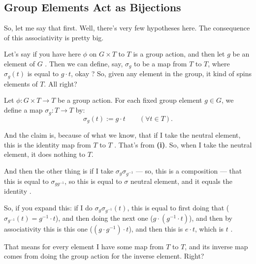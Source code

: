 \subsection{Group Elements Act as Bijections}

\begin{speech}[00:49:20 - 00:50:03]
So, let me say that first. Well, there's very few hypotheses here. The consequence of this associativity is pretty big.

Let's say if you have here $\phi$ on $G \times T$ to $T$ is a group action, and then let $g$ be an element of $G$ . Then we can define, say, $\sigma_g$ to be a map from $T$ to $T$, where $\sigma_g(t)$ is equal to $g \cdot t$, okay ? So, given any element in the group, it kind of spins elements of $T$. All right?
\end{speech}

\begin{content}
Let $\phi \colon G \times T \to T$ be a group action. For each fixed group element $g \in G$, we define a map $\sigma_g \colon T \to T$ by:
\[
\sigma_g(t) := g \cdot t \qquad (\forall t \in T).
\]
\end{content}

\begin{speech}[00:50:04 - 00:51:34]
And the claim is, because of what we know, that if I take the neutral element, this is the identity map from $T$ to $T$ . That's from \textbf{(i)}. So, when I take the neutral element, it does nothing to $T$.

And then the other thing is if I take $\sigma_g \sigma_{g^{-1}}$ --- so, this is a composition --- that this is equal to $\sigma_{g g^{-1}}$, so this is equal to $\sigma$ neutral element, and it equals the identity .

So, if you expand this: if I do $\sigma_g \sigma_{g^{-1}}(t)$, this is equal to first doing that ($\sigma_{g^{-1}}(t) = g^{-1} \cdot t$), and then doing the next one ($g \cdot (g^{-1} \cdot t)$), and then by associativity this is this one ($(g \cdot g^{-1}) \cdot t$), and then this is $e \cdot t$, which is $t$ .

That means for every element I have some map from $T$ to $T$, and its inverse map comes from doing the group action for the inverse element. Right?
\end{speech}


